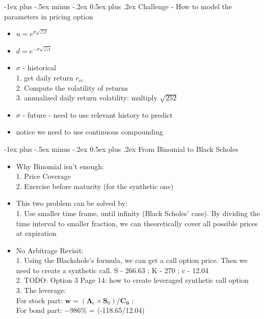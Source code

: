 \documentclass[10pt,landscape]{article}
\makeatletter
\renewcommand{\section}{\@startsection{section}{1}{0mm}%
                                {-1ex plus -.5ex minus -.2ex}%
                                {0.5ex plus .2ex}%
                                {\normalfont\large\bfseries}}
\makeatother
\begin{document}
\begin{multicols}{2}
    \section{Challenge - How to model the parameters in pricing option}
    \begin{itemize}
        \item $u = e^{\sigma \sqrt{\triangle t}}$
        \item $d = e^{- \sigma \sqrt{\triangle t}}$
        \item $\sigma$ - historical\\
            1. get daily return $r_{cc}$\\
            2. Compute the volatility of returns\\
            3. annualized daily return volatility: multiply $\sqrt{252}$
        \item $\sigma$ - future - need to use relevant history to predict\\
        \item {\color{red} notice we need to use continuous compounding}
    \end{itemize}

    \section{From Binomial to Black Scholes}
    \begin{itemize}
        \item Why Binomial isn't enough:\\
            1. Price Coverage\\
            2. Exercise before maturity (for the synthetic one)
        \item This two problem can be solved by:\\
            1. Use smaller time frame, until infinity (Black Scholes' case). By dividing the time interval to smaller fraction, we can theoretically cover all possible prices at expiration\\
        \item {\color{blue}No Arbitrage Revisit}:\\
            1. Using the Blackshole's formula, we can get a call option price. Then we need to create a synthetic call. S - 266.63 ; K - 270 ; c - 12.04\\
            2. {\color{green}TODO: Option 3 Page 14: }how to create leveraged synthetic call option\\
            3. The leverage: \\For stock part: $\mathbf{w}=\left(\mathbf{\Lambda}_{\mathrm{c}} \times \mathbf{S}_{0}\right) / \mathbf{C}_{\mathbf{0}}$ ; \\For bond part: $-986 \%$ = (-118.65/12.04)
    \end{itemize}


\end{multicols}
\end{document}
